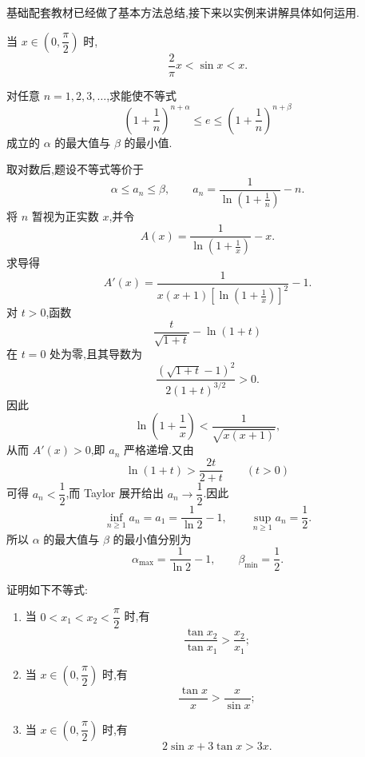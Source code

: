 基础配套教材已经做了基本方法总结,接下来以实例来讲解具体如何运用.




\begin{proposition}[\marktwostar]
    当 $x\in\left(0,\dfrac{\pi}{2}\right)$ 时,
    \[
        \dfrac{2}{\pi}x<\sin x<x.
    \]
\end{proposition}

\begin{example}
    对任意 $n=1,2,3,\ldots$,求能使不等式
    \[
        \left(1+\dfrac{1}{n}\right)^{n+\alpha}
        \leq e
        \leq\left(1+\dfrac{1}{n}\right)^{n+\beta}
    \]
    成立的 $\alpha$ 的最大值与 $\beta$ 的最小值.
\end{example}
\exampleblank

\begin{solution}
    取对数后,题设不等式等价于
    \[
        \alpha\leq a_n\leq\beta,
        \qquad
        a_n=\dfrac{1}{\ln(1+\frac{1}{n})}-n.
    \]
    将 $n$ 暂视为正实数 $x$,并令
    \[
        A(x)=\dfrac{1}{\ln(1+\frac{1}{x})}-x.
    \]
    求导得
    \[
        A'(x)=\dfrac{1}{x(x+1)\left[\ln(1+\frac{1}{x})\right]^2}-1.
    \]
    对 $t>0$,函数
    \[
        \dfrac{t}{\sqrt{1+t}}-\ln(1+t)
    \]
    在 $t=0$ 处为零,且其导数为
    \[
        \dfrac{(\sqrt{1+t}-1)^2}{2(1+t)^{3/2}}>0.
    \]
    因此
    \[
        \ln\left(1+\dfrac{1}{x}\right)
        <\dfrac{1}{\sqrt{x(x+1)}},
    \]
    从而 $A'(x)>0$,即 $a_n$ 严格递增.又由
    \[
        \ln(1+t)>\dfrac{2t}{2+t}
        \qquad(t>0)
    \]
    可得 $a_n<\dfrac{1}{2}$,而 Taylor 展开给出 $a_n\to\dfrac{1}{2}$.因此
    \[
        \inf\limits_{n\geq1}a_n=a_1=\dfrac{1}{\ln2}-1,
        \qquad
        \sup\limits_{n\geq1}a_n=\dfrac{1}{2}.
    \]
    所以 $\alpha$ 的最大值与 $\beta$ 的最小值分别为
    \[
        \boxed{\alpha_{\max}=\dfrac{1}{\ln2}-1},
        \qquad
        \boxed{\beta_{\min}=\dfrac{1}{2}}.
    \]
\end{solution}

\begin{example}
    证明如下不等式:
    \begin{enumerate}
        \item 当 $0<x_1<x_2<\dfrac{\pi}{2}$ 时,有
              \[
                  \dfrac{\tan x_2}{\tan x_1}>\dfrac{x_2}{x_1};
              \]
        \item 当 $x\in\left(0,\dfrac{\pi}{2}\right)$ 时,有
              \[
                  \dfrac{\tan x}{x}>\dfrac{x}{\sin x};
              \]
        \item 当 $x\in\left(0,\dfrac{\pi}{2}\right)$ 时,有
              \[
                  2\sin x+3\tan x>3x.
              \]
    \end{enumerate}
\end{example}
\exampleblank

